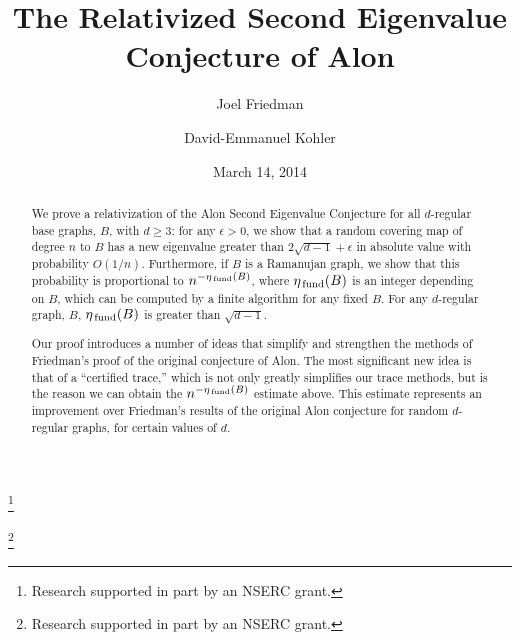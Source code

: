 \documentclass{memo-l}
\newcommand{\etafund}{{\eta_{\rm \,fund}}}
\theoremstyle{plain}
\theoremstyle{definition}
\numberwithin{section}{chapter}
\numberwithin{equation}{chapter}
\theoremstyle{plain}
\theoremstyle{definition}
\begin{document}
\frontmatter

\title{The Relativized Second Eigenvalue Conjecture of Alon}


\author{Joel Friedman}
\address{Department of Computer Science, 
        University of British Columbia, Vancouver, BC\ \ V6T 1Z4, CANADA,
        and Department of Mathematics, University of British Columbia,
        Vancouver, BC\ \ V6T 1Z2, CANADA. }
\curraddr{}
\thanks{Research supported in part by an NSERC grant.}
\author{David-Emmanuel Kohler}
\address{Department of Mathematics, University of British Columbia,
        Vancouver, BC\ \ V6T 1Z2, CANADA. }
\curraddr{}
\thanks{Research supported in part by an NSERC grant.}

\date{March 14, 2014}



\begin{abstract}
We prove a relativization of the Alon Second Eigenvalue Conjecture
for all $d$-regular base graphs, $B$, with $d\ge 3$:
for
any $\epsilon>0$, we show that a
random covering map of degree $n$ to $B$ has a new eigenvalue
greater than $2\sqrt{d-1}+\epsilon$ in absolute value
with probability $O(1/n)$.
Furthermore, if $B$ is a Ramanujan graph, we show that this probability
is proportional to $n^{-\etafund(B)}$, where $\etafund(B)$ is an
integer depending on $B$, which can be computed by a finite algorithm
for any fixed $B$.
For any $d$-regular graph, $B$, $\etafund(B)$ is greater than
$\sqrt{d-1}$.

Our proof introduces a number of ideas that simplify
and strengthen
the methods of Friedman's proof
of the original conjecture of Alon.
The most significant new idea is that of a ``certified trace,'' which
is not only greatly simplifies our trace methods, but is the reason
we can obtain the $n^{-\etafund(B)}$ estimate above.  This estimate
represents an improvement over Friedman's results of the original
Alon conjecture for random $d$-regular
graphs, for certain values of $d$.
\end{abstract}
\end{document}
